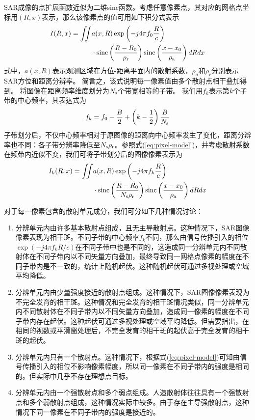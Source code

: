\documentclass[10.5pt,UTF8]{JR}
\theoremstyle{mystyle}
\begin{document}
SAR成像的点扩展函数近似为二维sinc函数。考虑任意像素点，其对应的网格点坐标用$(R,x)$表示，那么该像素点的值可用如下积分式表示
\begin{equation}\label{eq:pixel-model}
\begin{split}
I(R,x)=\iint &a(x,R) \exp\left(-j4\pi f_0\frac{R}{c}\right)\\
&\cdot \mathrm{sinc}\left(\frac{R-R_0}{\rho_{\rm r}}\right)\mathrm{sinc}\left(\frac{x-x_0}{\rho_{\rm a}}\right)dRdx
\end{split}
\end{equation}
式中，$a(x,R)$表示观测区域在方位-距离平面内的散射系数，$\rho_a$和$\rho_r$分别表示SAR方位和距离分辨率。
简言之，该式说明每一像素值由多个散射点相干叠加得到。
将图像在距离频率维度划分为$N_{\rm s}$个带宽相等的子带。
我们用$f_k$表示第$k$个子带的中心频率，其表达式为
\begin{equation}\label{}
f_k= f_0-\frac{B}{2}+\left(k-\frac{1}{2}\right) \frac{B}{N_{\rm s}}
\end{equation}
子带划分后，不仅中心频率相对于原图像的距离向中心频率发生了变化，距离分辨率也不同：各子带分辨率降低至$N_{\rm s}\rho_{\rm r}$。参照式(\ref{eq:pixel-model})，并考虑散射系数在频带内近似不变，我们可将子带划分后的图像像素表示为
\begin{equation}\label{eq:pixel-model2}
\begin{split}
I_k(R,x)=\iint &a(x,R) \exp\left(-j4\pi f_k\frac{R}{c}\right)\\
&\cdot {\rm \mathrm{sinc}}\left(\frac{R-R_0}{N_{\rm s}\rho_{\rm r}}\right){\rm \mathrm{sinc}}\left(\frac{x-x_0}{\rho_{\rm a}}\right)dRdx
\end{split}
\end{equation}


对于每一像素包含的散射单元成分，我们可分如下几种情况讨论：
\begin{enumerate}
\setlength{\itemsep}{0pt}
\setlength{\parsep}{0pt}
  \item 分辨单元内由许多基本散射点组成，且无主导散射点。这种情况下，SAR图像像素表现为相干斑。不同子带的中心频率$f_k$不同，那么由信号传播引入的相位$\exp\left(-j4\pi f_kR/c\right)$在不同子带中也是不同的，这造成同一分辨单元内不同散射体在不同子带内以不同矢量方向叠加，最终导致同一网格点像素的幅度在不同子带内是不一致的，统计上随机起伏。这种随机起伏可通过多视处理或空域平均降低。
  \item 分辨单元内由少量强度接近的散射点组成。这种情况下，SAR图像像素表现为不完全发育的相干斑。这种情况和完全发育的相干斑情况类似，同一分辨单元内不同散射体在不同子带内以不同矢量方向叠加，造成同一像素的幅度在不同子带内存在起伏。这种起伏可通过多视处理或空域平均降低。但需要指出，在相同的视数或平滑窗处理后，不完全发育的相干斑的起伏高于完全发育的相干斑的起伏。
  \item 分辨单元内只有一个散射点。这种情况下，根据式(\ref{eq:pixel-model})可知由信号传播引入的相位不影响像素幅度，所以同一像素在不同子带内的强度是相同的。但实际中几乎不存在理想点目标。
  \item 分辨单元内由一个强散射点和多个弱点组成。人造散射体往往具有一个强散射点和多个弱散射点组成，这种情况实际中较多。由于存在主导强散射点，这种情况下同一像素在不同子带内的强度是接近的。
\end{enumerate}
\end{document}
